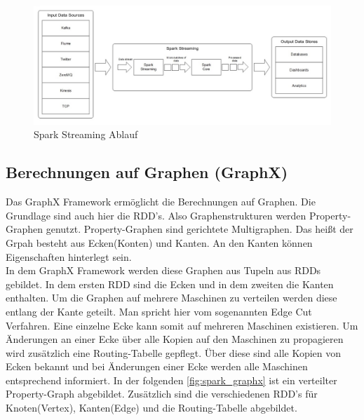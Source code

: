 \begin{figure}[h]
  \centering
  \includegraphics[width=\textwidth]{./bilder/spark_streaming.jpg}
  \caption{Spark Streaming Ablauf \cite{INFOQ_STREAMING}}\label{fig:spark_streaming}
\end{figure}





\newpage
\subsection{Berechnungen auf Graphen (GraphX)}

Das GraphX Framework ermöglicht die Berechnungen auf Graphen. Die Grundlage sind auch hier die RDD's. Also Graphenstrukturen werden Property-Graphen genutzt. 
Property-Graphen sind gerichtete Multigraphen. Das heißt der Grpah besteht aus Ecken(Konten) und Kanten. An den Kanten können Eigenschaften hinterlegt sein.\\

\noindent
In dem GraphX Framework werden diese Graphen aus Tupeln aus RDDs gebildet. In dem ersten RDD sind die Ecken und in dem zweiten die Kanten enthalten. Um die Graphen auf mehrere Maschinen zu verteilen werden diese entlang der Kante geteilt. Man spricht hier vom sogenannten Edge Cut Verfahren. Eine einzelne Ecke kann somit auf mehreren Maschinen existieren. Um Änderungen an einer Ecke über alle Kopien auf den Maschinen zu propagieren wird zusätzlich eine Routing-Tabelle gepflegt. Über diese sind alle Kopien von Ecken bekannt und bei Änderungen einer Ecke werden alle Maschinen entsprechend informiert. 
In der folgenden \autoref{fig:spark_graphx} ist ein verteilter Property-Graph abgebildet. Zusätzlich sind die verschiedenen RDD's für Knoten(Vertex), Kanten(Edge) und die Routing-Tabelle abgebildet.

